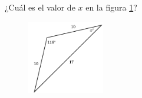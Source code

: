 \question[15]  ¿Cuál es el valor de $x$ en la figura \ref{fig:findangle14}?
\begin{figure}[H]
    \begin{center}
        \includegraphics[width=0.3\textwidth]{../images/findangle14.png}
    \end{center}
    \caption{}
    \label{fig:findangle14}
\end{figure}